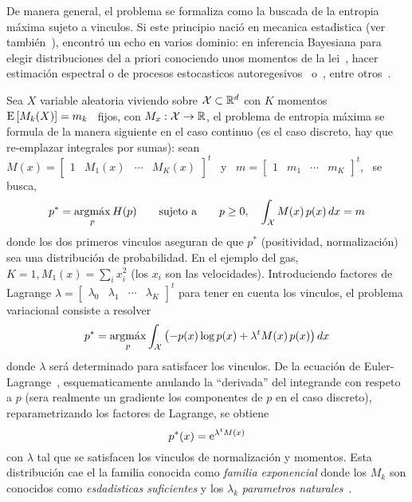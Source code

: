De  manera general,  el problema  se formaliza  como la  buscada de  la entropia
m\'axima sujeto  a vinculos. Si  este principio naci\'o en  mecanica estadistica
(ver  tambi\'en~\cite{Jay57,  Jay57:2, Jay65}),  encontr\'o  un  echo en  varios
dominio:  en  inferencia  Bayesiana  para  elegir distribuciones  del  a  priori
conociendo   unos  momentos   de  la   lei~\cite{Rob07,  Jay68,   Jay82},  hacer
estimaci\'on  espectral o  de  procesos estocasticos  autoregesivos~\cite{Bur67,
  Bur75,     Jay82}     o~\cite[cap.~12]{CovTho06},     entre     otros~\cite[\&
ref.]{KapKes92}.

Sea $X$ variable aleatoria viviendo  sobre $\mathcal{X} \subset \mathbb{R}^d$ con $K$ momentos
\  $\operatorname{E}\left[ M_k(X)  \right]  = m_k$  \ fijos,  con  $M_x: \mathcal{X}  \to \mathbb{R}$,  el
problema  de entropia  m\'axima se  formula de  la manera  siguiente en  el caso
continuo (es el caso discreto, hay que re-emplazar integrales por sumas): sean \
$M(x) = \begin{bmatrix} 1  & M_1(x) & \cdots & M_K(x) \end{bmatrix}^t$  \ y \ $m
= \begin{bmatrix} 1 & m_1 & \cdots & m_K \end{bmatrix}^t$, \ se busca,
%
\[
p^* = \operatorname*{argm\acute{a}x}_p H(p) \qquad \mbox{sujeto a} \qquad p \ge 0, \quad \int_{\mathcal{X}} M(x)
\, p(x) \, dx = m
\]
%
donde   los  dos  primeros   vinculos  aseguran   de  que   $p^*$  (positividad,
normalizaci\'on) sea una distribuci\'on de  probabilidad. En el ejemplo del gas,
$K =  1, M_1(x) = \sum_i  x_i^2$ (los $x_i$ son  las velocidades). Introduciendo
factores de Lagrange $\lambda = \begin{bmatrix} \lambda_0 & \lambda_1 & \cdots &
  \lambda_K  \end{bmatrix}^t$ para  tener en  cuenta los  vinculos,  el problema
variacional   consiste  a   resolver~\cite{Gelfom63,  Bru04,   Mil00,  CamMar09,
  CovTho06}
%
\[
p^* = \operatorname*{argm\acute{a}x}_p \int_{\mathcal{X}} \left( - p(x) \log p(x) + \lambda^t M(x) \, p(x) \right)
dx
\]
%
donde  $\lambda$  ser\'a  determinado  para  satisfacer  los  vinculos.   De  la
ecuaci\'on  de Euler-Lagrange~\cite{GelFom63, Bru04},  esquematicamente anulando
la ``derivada''  del integrande con respeto  a $p$ (sera  realmente un gradiente
los componentes  de $p$ en el  caso discreto), reparametrizando  los factores de
Lagrange, se obtiene
%
\[
p^*(x) = \operatorname{e}^{\lambda^t M(x)}
\]
%
con $\lambda$ tal que se  satisfacen los vinculos de normalizaci\'on y momentos.
Esta distribuci\'on  cae el la  familia conocida como {\it  familia exponencial}
donde  los  $M_k$  son  conocidos  como {\it  esdadisticas  suficientes}  y  los
$\lambda_k$  {\it  parametros  naturales}~\cite{Dar35, Koo36,  And70,  LehCas98,
  Rob07}.

